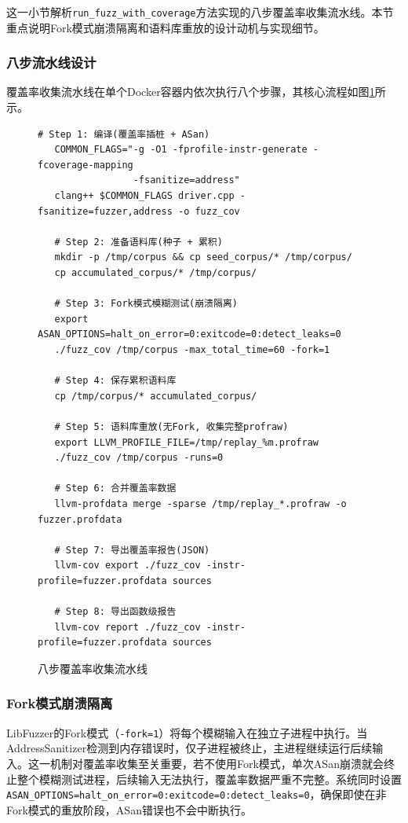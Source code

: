 这一小节解析\texttt{run\_fuzz\_with\_coverage}方法实现的八步覆盖率收集流水线。本节重点说明Fork模式崩溃隔离和语料库重放的设计动机与实现细节。

\subsubsection{八步流水线设计}

覆盖率收集流水线在单个Docker容器内依次执行八个步骤，其核心流程如图\ref{fig:fuzz-pipeline}所示。

\begin{figure}[H]
    \centering
    \begin{lstlisting}[style=style@base]
   # Step 1: 编译(覆盖率插桩 + ASan)
   COMMON_FLAGS="-g -O1 -fprofile-instr-generate -fcoverage-mapping
                 -fsanitize=address"
   clang++ $COMMON_FLAGS driver.cpp -fsanitize=fuzzer,address -o fuzz_cov

   # Step 2: 准备语料库(种子 + 累积)
   mkdir -p /tmp/corpus && cp seed_corpus/* /tmp/corpus/
   cp accumulated_corpus/* /tmp/corpus/

   # Step 3: Fork模式模糊测试(崩溃隔离)
   export ASAN_OPTIONS=halt_on_error=0:exitcode=0:detect_leaks=0
   ./fuzz_cov /tmp/corpus -max_total_time=60 -fork=1

   # Step 4: 保存累积语料库
   cp /tmp/corpus/* accumulated_corpus/

   # Step 5: 语料库重放(无Fork, 收集完整profraw)
   export LLVM_PROFILE_FILE=/tmp/replay_%m.profraw
   ./fuzz_cov /tmp/corpus -runs=0

   # Step 6: 合并覆盖率数据
   llvm-profdata merge -sparse /tmp/replay_*.profraw -o fuzzer.profdata

   # Step 7: 导出覆盖率报告(JSON)
   llvm-cov export ./fuzz_cov -instr-profile=fuzzer.profdata sources

   # Step 8: 导出函数级报告
   llvm-cov report ./fuzz_cov -instr-profile=fuzzer.profdata sources
    \end{lstlisting}
    \caption{八步覆盖率收集流水线}
    \label{fig:fuzz-pipeline}
\end{figure}

\subsubsection{Fork模式崩溃隔离}

LibFuzzer的Fork模式（\texttt{-fork=1}）将每个模糊输入在独立子进程中执行。当AddressSanitizer检测到内存错误时，仅子进程被终止，主进程继续运行后续输入。这一机制对覆盖率收集至关重要，若不使用Fork模式，单次ASan崩溃就会终止整个模糊测试进程，后续输入无法执行，覆盖率数据严重不完整。系统同时设置\texttt{ASAN\_OPTIONS=halt\_on\_error=0:exitcode=0:detect\_leaks=0}，确保即使在非Fork模式的重放阶段，ASan错误也不会中断执行。

